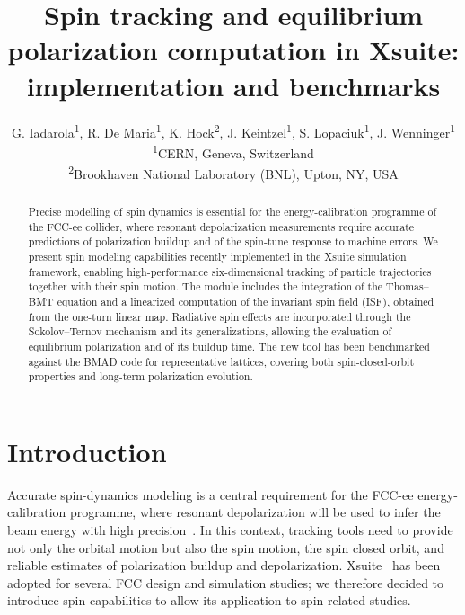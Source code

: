 \documentclass[a4paper,
               biblatex,     %
               hyphens,      %
               ]{jacow}
\begin{document}
\title{Spin tracking and equilibrium polarization computation in Xsuite: implementation and benchmarks}

\author{
G. Iadarola\textsuperscript{1},
R. De Maria\textsuperscript{1},
K. Hock\textsuperscript{2},
J. Keintzel\textsuperscript{1},
S. Lopaciuk\textsuperscript{1},
J. Wenninger\textsuperscript{1}
\\ \textsuperscript{1}CERN, Geneva, Switzerland
\\ \textsuperscript{2}Brookhaven National Laboratory (BNL), Upton, NY, USA
}
\maketitle

%
\begin{abstract}
Precise modelling of spin dynamics is essential for the energy-calibration programme of the FCC-ee collider, where resonant depolarization measurements require accurate predictions of polarization buildup and of the spin-tune response to machine errors. We present spin modeling capabilities recently implemented in the Xsuite simulation framework, enabling high-performance six-dimensional tracking of particle trajectories together with their spin motion. The module includes the integration of the Thomas–BMT equation and a linearized computation of the invariant spin field (ISF), obtained from the one-turn linear map. Radiative spin effects are incorporated through the Sokolov–Ternov mechanism and its generalizations, allowing the evaluation of equilibrium polarization and of its buildup time.
The new tool has been benchmarked against the BMAD code for representative lattices, covering both spin-closed-orbit properties and long-term polarization evolution.
\end{abstract}

\section{Introduction}

Accurate spin-dynamics modeling is a central requirement for the FCC-ee energy-calibration programme, where resonant depolarization will be used to infer the beam energy with high precision~\cite{fcc_ee_cdr}. In this context, tracking tools need to provide not only the orbital motion but also the spin motion, the spin closed orbit, and reliable estimates of polarization buildup and depolarization. Xsuite~\cite{xsuite_reference_paper,xsuite_docs} has been adopted for several FCC design and simulation studies; we therefore decided to introduce spin capabilities to allow its application to spin-related studies.
\end{document}
